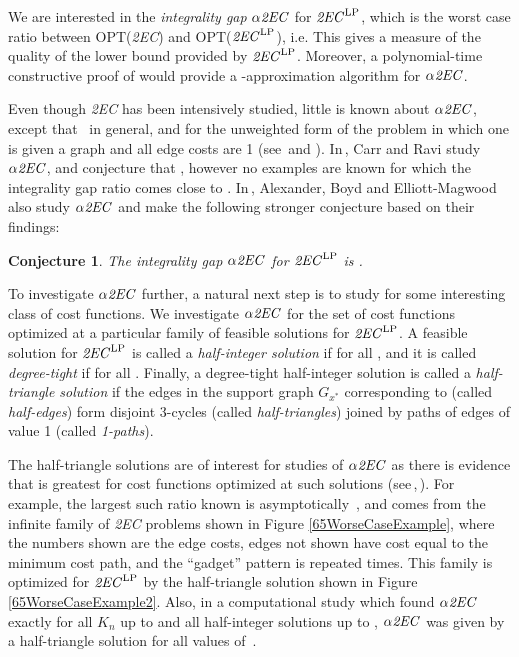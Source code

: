 \documentclass[oneeqnum,final]{siamltex1213}
\newcommand{\TwoEC}{\emph{2EC}}
\newcommand{\TwoECLP}{\ensuremath{\text{\TwoEC}^{\text{LP}}}}
\newcommand{\alphaTwoEC}{\ensuremath{\alpha\text{\TwoEC}}}
\newcommand{\Kn}{\ensuremath{K_{n}}}
\newcommand{\Gx}{\ensuremath{G_{x^{*}}}}
\newtheorem{conjecture}{Conjecture}
\begin{document}
We are interested in the \emph{integrality gap} \alphaTwoEC{} for \TwoECLP, which is the worst case ratio between OPT(\TwoEC) and OPT(\TwoECLP), i.e.  This gives a measure of the quality of the lower bound provided by \TwoECLP. Moreover, a polynomial-time constructive proof of  would provide a -approximation algorithm for \alphaTwoEC.

Even though \TwoEC{} has been intensively studied, little is known about \alphaTwoEC, except that \,\cite{alexander} in general, and  for the unweighted form of the problem in which one is given a graph and all edge costs are 1 (see\,\cite{boyd} and \cite{sebo}). In\,\cite{carr}, Carr and Ravi study \alphaTwoEC{}, and conjecture that , however no examples are known for which the integrality gap ratio comes close to . In\,\cite{alexander}, Alexander, Boyd and Elliott-Magwood also study \alphaTwoEC{} and make the following stronger conjecture based on their findings:

\begin{conjecture}\cite{alexander}\label{conjecture}
The integrality gap \alphaTwoEC{} for \TwoECLP{} is .
\end{conjecture}

To investigate \alphaTwoEC{} further, a natural next step is to study  for some interesting class of cost functions. We investigate \alphaTwoEC{} for the set of cost functions optimized at a particular family of feasible solutions for \TwoECLP. A feasible solution  for \TwoECLP{} is called a \emph{half-integer solution} if  for all , and it is called \emph{degree-tight} if  for all . Finally, a degree-tight half-integer solution is called a \emph{half-triangle solution} if the edges in the support graph \Gx{} corresponding to  (called \emph{half-edges}) form disjoint 3-cycles (called \emph{half-triangles}) joined by paths of edges of value 1 (called \emph{\mbox{1-paths}}).

The half-triangle solutions are of interest for studies of \alphaTwoEC{} as there is \mbox{evidence} that  is greatest for cost functions optimized at such solutions (see\,\cite{alexander},\,\cite{carr}). For example, the largest such ratio known is asymptotically \,\cite{alexander}, and comes from the infinite family of \TwoEC{} problems shown in Figure \ref{65WorseCaseExample}, where the numbers shown are the edge costs, edges  not shown have cost equal to the minimum cost  path, and the ``gadget'' pattern is repeated  times. This family is optimized for \TwoECLP{} by the half-triangle solution  shown in Figure \ref{65WorseCaseExample2}. Also, in a computational study which found \alphaTwoEC{} exactly for all \Kn{} up to  and all half-integer solutions up to , \alphaTwoEC{} was given by a half-triangle solution for all values of \,\cite{alexander}.
\end{document}
